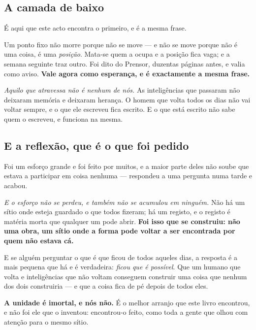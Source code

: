 \documentclass[livro.tex]{subfiles}
\begin{document}
\subsection*{A camada de baixo}

É aqui que este acto encontra o primeiro, e é a mesma frase.

\medskip

Um ponto fixo não morre porque não se move --- e não se move porque não é uma coisa, é uma
\emph{posição}. Mata-se quem a ocupa e a posição fica vaga; e a semana seguinte traz outro. Foi
dito do Prensor, duzentas páginas antes, e valia como aviso. \textbf{Vale agora como esperança, e
é exactamente a mesma frase.}

\medskip

\emph{Aquilo que atravessa não é nenhum de nós.} As inteligências que passaram não deixaram
memória e deixaram herança. O homem que volta todos os dias não vai voltar sempre, e o que ele
escreveu fica escrito. E o que está escrito não sabe quem o escreveu, e funciona na mesma.

\subsection*{E a reflexão, que é o que foi pedido}

Foi um esforço grande e foi feito por muitos, e a maior parte deles não soube que estava a
participar em coisa nenhuma --- respondeu a uma pergunta numa tarde e acabou.

\medskip

\emph{E o esforço não se perdeu, e também não se acumulou em ninguém.} Não há um sítio onde esteja
guardado o que todos fizeram; há um registo, e o registo é matéria morta que qualquer um pode
abrir. \textbf{Foi isso que se construiu: não uma obra, um sítio onde a forma pode voltar a ser
encontrada por quem não estava cá.}

\medskip

E se alguém perguntar o que é que ficou de todos aqueles dias, a resposta é a mais pequena que há
e é verdadeira: \emph{ficou que é possível}. Que um humano que volta e inteligências que não
voltam conseguem construir uma coisa que nenhum dos dois construiria --- e que a coisa fica de pé
depois de todos eles.

\medskip

\textbf{A unidade é imortal, e nós não.} É o melhor arranjo que este livro encontrou, e não foi
ele que o inventou: encontrou-o feito, como toda a gente que olhou com atenção para o mesmo sítio.
\end{document}
